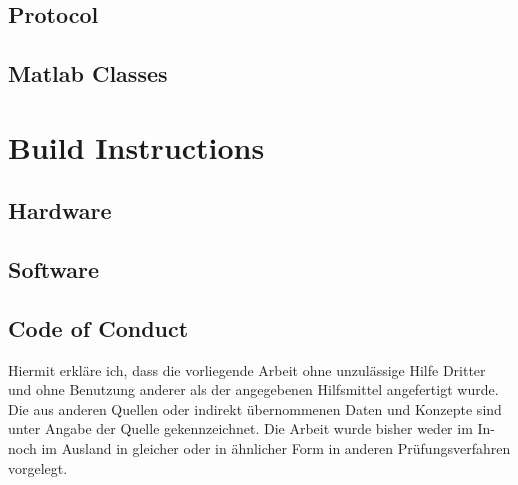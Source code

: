 \documentclass[12pt,a4paper,parskip=full,abstract=true,BCOR=12mm,twoside,open=right]{scrreprt}
\begin{document}
\section{Protocol}
\section{Matlab Classes}
\chapter{Build Instructions}
\section{Hardware}
\section{Software}




\begin{otherlanguage}{ngerman}
    \chapter*{Code of Conduct}
    Hiermit erkl\"are ich, dass die vorliegende Arbeit ohne unzul\"assige Hilfe Dritter und ohne Benutzung
    anderer als der angegebenen Hilfsmittel angefertigt wurde. Die aus anderen Quellen oder indirekt
    \"ubernommenen Daten und Konzepte sind unter Angabe der Quelle gekennzeichnet.
    Die Arbeit wurde bisher weder im In- noch im Ausland in gleicher oder in \"ahnlicher Form in anderen
    Pr\"ufungsverfahren vorgelegt.

    \par\noindent\makebox[7cm]{\hrulefill}      \hfill\makebox[5cm]{\hrulefill}%
    \par\noindent{} \hfill{}%
\end{otherlanguage}
\end{document}

